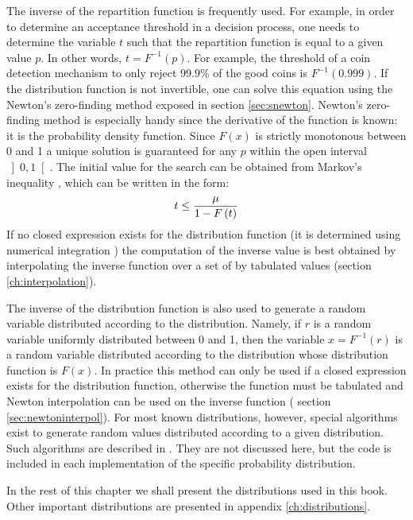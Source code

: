 The inverse of the repartition function is frequently used. For
example, in order to determine an acceptance threshold in a
decision process, one needs to determine the variable $t$ such
that the repartition function is equal to a given value $p$. In
other words, $t=F^{-1}\left(p\right)$. For example, the threshold
of a coin detection mechanism to only reject $99.9\%$ of the good
coins is $F^{-1}\left(0.999\right)$. If the distribution function
is not invertible, one can solve this equation using the Newton's
zero-finding method exposed in section \ref{sec:snewton}. Newton's
zero-finding method is especially handy since the derivative of
the function is known: it is the probability density function.
Since $F\left(x\right)$ is strictly monotonous between 0 and 1 a
unique solution is guaranteed for any $p$ within the open interval
$\left]0,1\right[$. The initial value for the search can be
obtained from Markov's inequality \cite{CorLeiRiv}, which can be
written in the form:
\begin{equation}
  t\le {\displaystyle \mu \over\displaystyle 1-F\left(t\right)}
\end{equation}
If no closed expression exists for the distribution function (it
is determined using numerical integration \eg) the computation of
the inverse value is best obtained by interpolating the inverse
function over a set of by tabulated values (\cf section
\ref{ch:interpolation}).

The inverse of the distribution function is also used to generate
a random variable distributed according to the distribution.
Namely, if $r$ is a random variable uniformly distributed between
0 and 1, then the variable $x=F^{-1}\left(r\right)$ is a random
variable distributed according to the distribution whose
distribution function is $F\left(x\right)$. In practice this
method can only be used if a closed expression exists for the
distribution function, otherwise the function must be tabulated
and Newton interpolation can be used on the inverse function (\cf
section \ref{sec:newtoninterpol}). For most known distributions,
however, special algorithms exist to generate random values
distributed according to a given distribution. Such algorithms are
described in \cite{LawKel}. They are not discussed here, but the
code is included in each implementation of the specific
probability distribution.

In the rest of this chapter we shall present the distributions
used in this book. Other important distributions are presented in
appendix \ref{ch:distributions}.

